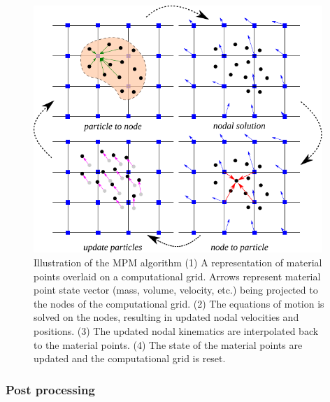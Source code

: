 \begin{figure}[htbp]
\centering
\includegraphics[width=0.975\textwidth]{MPMsteps}
\caption[Illustration of the MPM algorithm]{Illustration of the MPM algorithm (1) A representation of material points overlaid on a computational grid. Arrows represent material point state vector (mass, volume, velocity, etc.) being projected to the nodes of the computational grid. (2) The equations of motion is solved on the nodes, resulting in updated nodal velocities and positions. (3) The updated nodal kinematics are interpolated back to the material points. (4)  The state of the material points are updated and the computational grid is reset.} 
\label{fig:MPMsteps}
\end{figure}

\subsubsection{Post processing}

